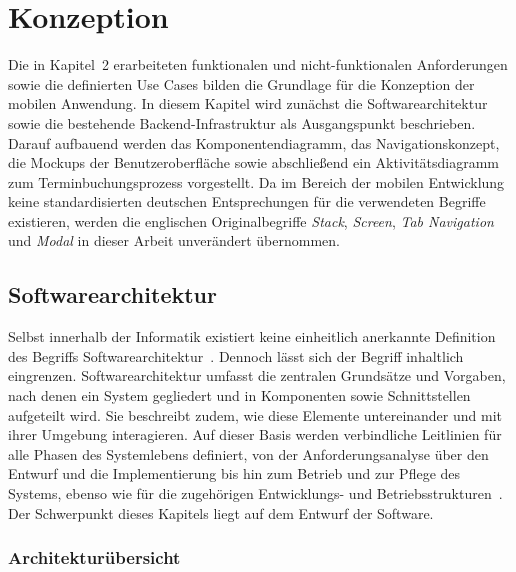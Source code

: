 \chapter{Konzeption}
\label{chap:konzeption}

Die in Kapitel~2 erarbeiteten funktionalen und nicht-funktionalen Anforderungen sowie die definierten Use Cases bilden die Grundlage für die Konzeption der mobilen Anwendung. In diesem Kapitel wird zunächst die Softwarearchitektur sowie die bestehende Backend-Infrastruktur als Ausgangspunkt beschrieben. Darauf aufbauend werden das Komponentendiagramm, das Navigationskonzept, die Mockups der Benutzeroberfläche sowie abschließend ein Aktivitätsdiagramm zum Terminbuchungsprozess vorgestellt. Da im Bereich der mobilen Entwicklung keine standardisierten deutschen Entsprechungen für die verwendeten Begriffe existieren, werden die englischen Originalbegriffe \textit{Stack}, \textit{Screen}, \textit{Tab Navigation} und \textit{Modal} in dieser Arbeit unverändert übernommen.

\section{Softwarearchitektur}

Selbst innerhalb der Informatik existiert keine einheitlich anerkannte Definition des Begriffs Softwarearchitektur~\cite[S.~1]{richards2021}. Dennoch lässt sich der Begriff inhaltlich eingrenzen. Softwarearchitektur umfasst die zentralen Grundsätze und Vorgaben, nach denen ein System gegliedert und in Komponenten sowie Schnittstellen aufgeteilt wird. Sie beschreibt zudem, wie diese Elemente untereinander und mit ihrer Umgebung interagieren. Auf dieser Basis werden verbindliche Leitlinien für alle Phasen des Systemlebens definiert, von der Anforderungsanalyse über den Entwurf und die Implementierung bis hin zum Betrieb und zur Pflege des Systems, ebenso wie für die zugehörigen Entwicklungs- und Betriebsstrukturen~\cite[S.~21]{gharbi2020}. Der Schwerpunkt dieses Kapitels liegt auf dem Entwurf der Software.

\subsection{Architekturübersicht}
\label{sec:architektur}

